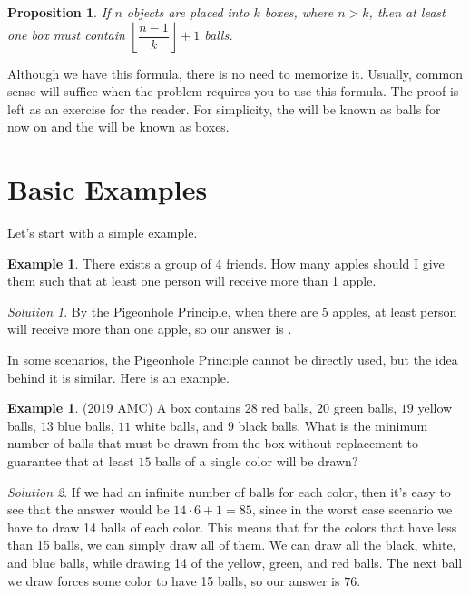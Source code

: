 \documentclass[l1pt]{article}
\theoremstyle{plain}
\newtheorem{prop}[thm]{Proposition}
\theoremstyle{definition}
\newtheorem{example}[thm]{Example}
\theoremstyle{remark}
\newtheorem*{solution}{Solution}
\begin{document}
\begin{mdframed}
    \begin{prop}
    If $n$ objects are placed into $k$ boxes, where $n>k$, then at least one box must contain $\left\lfloor \dfrac{n-1}{k} \right\rfloor + 1 $ balls.
    \end{prop}
\end{mdframed}

Although we have this formula, there is no need to memorize it. Usually, common sense will suffice when the problem requires you to use this formula. The proof is left as an exercise for the reader. For simplicity, the  will be known as balls for now on and the  will be known as boxes.

\bigskip

\section{Basic Examples}
Let's start with a simple example.

\begin{example}
There exists a group of 4 friends. How many apples should I give them such that at least one person will receive more than 1 apple.
\end{example}

\begin{solution}
By the Pigeonhole Principle, when there are 5 apples, at least person will receive more than one apple, so our answer is .
\end{solution}

\bigskip

In some scenarios, the Pigeonhole Principle cannot be directly used, but the idea behind it is similar. Here is an example.

\begin{example}
(2019 AMC) A box contains $28$ red balls, $20$ green balls, $19$ yellow balls, $13$ blue balls, $11$ white balls, and $9$ black balls. What is the minimum number of balls that must be drawn from the box without replacement to guarantee that at least $15$ balls of a single color will be drawn$?$
\end{example}

\begin{solution}
If we had an infinite number of balls for each color, then it's easy to see that the answer would be $14\cdot 6+1=85$, since in the worst case scenario we have to draw 14 balls of each color. This means that for the colors that have less than 15 balls, we can simply draw all of them. We can draw all the black, white, and blue balls, while drawing 14 of the yellow, green, and red balls. The next ball we draw forces some color to have 15 balls, so our answer is $\boxed{76}$.
\end{solution}
\end{document}
